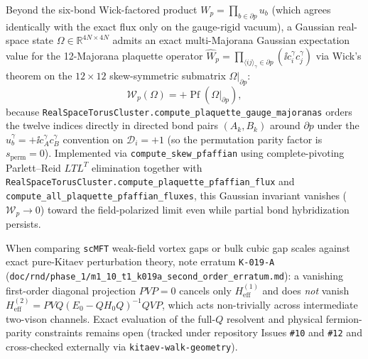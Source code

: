Beyond the six-bond Wick-factored product $W_p = \prod_{b \in \partial p} u_b$ (which agrees identically with the exact flux only on the gauge-rigid vacuum), a Gaussian real-space state $\Omega \in \mathbb{R}^{4N \times 4N}$ admits an exact multi-Majorana Gaussian expectation value for the 12-Majorana plaquette operator $\hat{W}_p = \prod_{\langle ij\rangle_\gamma \in \partial p} (\ii c_i^\gamma c_j^\gamma)$ via Wick's theorem on the $12 \times 12$ skew-symmetric submatrix $\Omega|_{\partial p}$:
\begin{equation}
\label{eq:plaquette_pfaffian_12m}
\mathcal{W}_p(\Omega) = +\operatorname{Pf}\!\left(\Omega|_{\partial p}\right),
\end{equation}
because \texttt{RealSpaceTorusCluster.compute\_plaquette\_gauge\_majoranas} orders the twelve indices directly in directed bond pairs $(A_k, B_k)$ around $\partial p$ under the $\hat{u}_b^\gamma = +\ii c_A^\gamma c_B^\gamma$ convention on $\mathcal{D}_i = +1$ (so the permutation parity factor is $s_{\mathrm{perm}} = 0$). Implemented via \texttt{compute\_skew\_pfaffian} using complete-pivoting Parlett--Reid $L T L^T$ elimination together with \texttt{RealSpaceTorusCluster.compute\_plaquette\_pfaffian\_flux} and \texttt{compute\_all\_plaquette\_pfaffian\_fluxes}, this Gaussian invariant vanishes ($\mathcal{W}_p \to 0$) toward the field-polarized limit even while partial bond hybridization persists.

\begin{remark}
\label{rem:m1_10_k019a_erratum}
When comparing \texttt{scMFT} weak-field vortex gaps or bulk cubic gap scales against exact pure-Kitaev perturbation theory, note erratum \texttt{K-019-A} (\texttt{doc/rnd/phase\_1/m1\_10\_t1\_k019a\_second\_order\_erratum.md}): a vanishing first-order diagonal projection $PVP = 0$ cancels only $H_{\mathrm{eff}}^{(1)}$ and does \emph{not} vanish $H_{\mathrm{eff}}^{(2)} = PV Q(E_0 - Q H_0 Q)^{-1} Q VP$, which acts non-trivially across intermediate two-vison channels. Exact evaluation of the full-$Q$ resolvent and physical fermion-parity constraints remains open (tracked under repository Issues \texttt{\#10} and \texttt{\#12} and cross-checked externally via \texttt{kitaev-walk-geometry}).
\end{remark}
